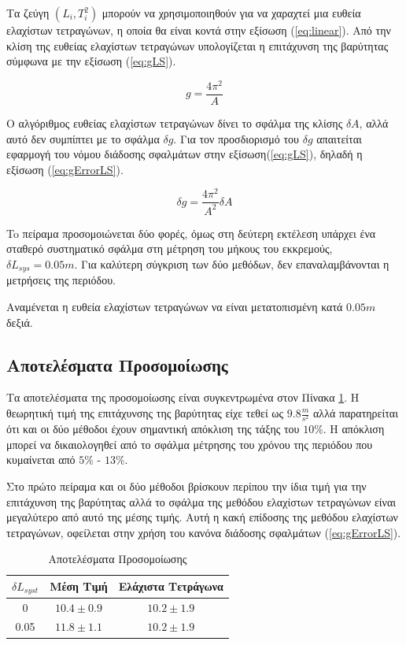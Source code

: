 \documentclass[assignment1.tex]{subfiles}
\begin{document}
Τα ζεύγη $(L_i, T_i^2)$ μπορούν να χρησιμοποιηθούν για να χαραχτεί μια ευθεία ελαχίστων τετραγώνων, η οποία θα είναι κοντά στην εξίσωση (\ref{eq:linear}). Από την κλίση της ευθείας ελαχίστων τετραγώνων υπολογίζεται η επιτάχυνση της βαρύτητας σύμφωνα με την εξίσωση (\ref{eq:gLS}).

\begin{equation}
g = \frac{4\pi^2}{A}
\label{eq:gLS}
\end{equation}

Ο αλγόριθμος ευθείας ελαχίστων τετραγώνων δίνει το σφάλμα της κλίσης $\delta A$, αλλά αυτό δεν συμπίπτει με το σφάλμα $\delta g$. Για τον προσδιορισμό του $\delta g$ απαιτείται εφαρμογή του νόμου διάδοσης σφαλμάτων στην εξίσωση(\ref{eq:gLS}), δηλαδή η εξίσωση (\ref{eq:gErrorLS}).

\begin{equation}
\delta g = \frac{4\pi^2}{A^2}\delta A
\label{eq:gErrorLS}
\end{equation}

To πείραμα προσομοιώνεται δύο φορές, όμως στη δεύτερη εκτέλεση υπάρχει ένα σταθερό συστηματικό σφάλμα στη μέτρηση του μήκους του εκκρεμούς, $\delta L_{sys}=0.05m$. Για καλύτερη σύγκριση των δύο μεθόδων, δεν επαναλαμβάνονται η μετρήσεις της περιόδου.

Αναμένεται η ευθεία ελαχίστων τετραγώνων να είναι μετατοπισμένη κατά $0.05m$ δεξιά.

\subsection*{Αποτελέσματα Προσομοίωσης}

Τα αποτελέσματα της προσομοίωσης είναι συγκεντρωμένα στον Πίνακα \ref{table:results}. Η θεωρητική τιμή της επιτάχυνσης της βαρύτητας είχε τεθεί ως $9.8\frac{m}{s^2}$ αλλά παρατηρείται ότι και οι δύο μέθοδοι έχουν σημαντική απόκλιση της τάξης του $10\%$. Η απόκλιση μπορεί να δικαιολογηθεί από το σφάλμα μέτρησης του χρόνου της περιόδου που κυμαίνεται από $5\%$ - $13\%$.

Στο πρώτο πείραμα και οι δύο μέθοδοι βρίσκουν περίπου την ίδια τιμή για την επιτάχυνση της βαρύτητας αλλά το σφάλμα της μεθόδου ελαχίστων τετραγώνων είναι μεγαλύτερο από αυτό της μέσης τιμής. Αυτή η κακή επίδοσης της μεθόδου ελαχίστων τετραγώνων, οφείλεται στην χρήση του κανόνα διάδοσης σφαλμάτων (\ref{eq:gErrorLS}).

\begin{table}[ht]
\centering
\begin{tabular}{||c c c||} 
 \hline
 $\delta L_{syst}$& Μέση Τιμή & Ελάχιστα Τετράγωνα \\ [0.5ex] 
 \hline\hline
 0 & $10.4\pm 0.9$ & $10.2 \pm 1.9$ \\ 
 0.05 & $11.8\pm 1.1$ & $10.2 \pm 1.9$ \\ [1ex] 
 \hline
\end{tabular}
\caption{Αποτελέσματα Προσομοίωσης}
\label{table:results}
\end{table}
\end{document}
